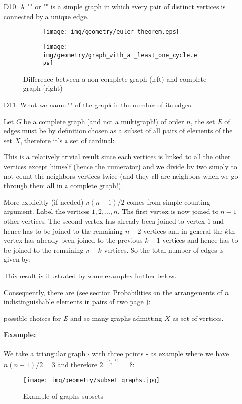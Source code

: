 {\begin{enumerate}
	\item[D10.] A "\label{complete graph}" or "" is a simple graph in which every pair of distinct vertices is connected by a unique edge.
	\begin{figure}[H]
		\centering
		\begin{subfigure}{0.4\textwidth}
			\texttt{[image: img/geometry/euler\_theorem.eps]}
		\end{subfigure}
		\begin{subfigure}{0.4\textwidth}
			\texttt{[image: img/geometry/graph\_with\_at\_least\_one\_cycle.eps]}
		\end{subfigure}		
		\caption{Difference between a non-complete graph (left) and complete graph (right)}		
	\end{figure}
	
	\item[D11.] What we name "" of the graph is the number of its edges.
	
	Let $G$ be a complete graph (and not a multigraph!) of order $n$, the set $E$ of edges must be by definition chosen as a subset of all pairs of elements of the set $X$, therefore it's a set of cardinal:
	
	This is a relatively trivial result since each vertices is linked to all the other vertices except himself (hence the numerator) and we divide by two simply to not count the neighbors vertices twice (and they all are neighbors when we go through them all in a complete graph!).
	
	More explicitly (if needed) $n(n-1)/2$ comes from simple counting argument. Label the vertices $1,2,\ldots,n$. The first vertex is now joined to $n-1$ other vertices. The second vertex has already been joined to vertex $1$ and hence has to be joined to the remaining $n-2$ vertices and in general the $k$th vertex has already been joined to the previous $k-1$ vertices and hence has to be joined to the remaining $n-k$ vertices. So the total number of edges is given by:
	
	This result is illustrated by some examples further below.
	
	Consequently, there are (see section Probabilities on the arrangements  of $n$ indistinguishable elements in pairs of two page \pageref{simple arrangements with repetitions}):
	
	possible choices for $E$ and so many graphs admitting $X$ as set of vertices. 
	\begin{tcolorbox}[colframe=black,colback=white,sharp corners]
	\textbf{{\Large {}}Example:}\\\\
	We take a triangular graph - with three points - as example where we have $n(n-1)/2=3$ and therefore $2^{\frac{n(n-1)}{2}}=8$:
	\begin{figure}[H]
		\centering
		\texttt{[image: img/geometry/subset\_graphs.jpg]}
		\caption{Example of graphs subsets}
	\end{figure}
	\end{tcolorbox}
	

\end{enumerate}}
